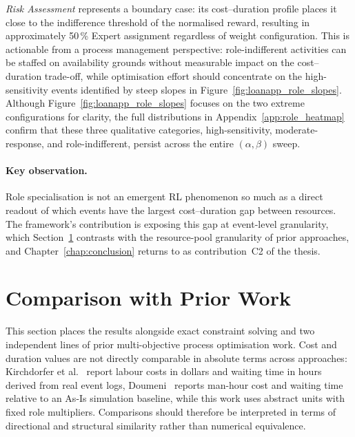 \textit{Risk Assessment} represents a boundary case: its cost--duration profile places it close to the indifference threshold of the normalised reward, resulting in approximately 50\,\% Expert assignment regardless of weight configuration. This is actionable from a process management perspective: role-indifferent activities can be staffed on availability grounds without measurable impact on the cost--duration trade-off, while optimisation effort should concentrate on the high-sensitivity events identified by steep slopes in Figure~\ref{fig:loanapp_role_slopes}. Although Figure~\ref{fig:loanapp_role_slopes} focuses on the two extreme configurations for clarity, the full distributions in Appendix~\ref{app:role_heatmap} confirm that these three qualitative categories, high-sensitivity, moderate-response, and role-indifferent, persist across the entire $(\alpha, \beta)$ sweep.

\paragraph{Key observation.} Role specialisation is not an emergent RL phenomenon so much as a direct readout of which events have the largest cost--duration gap between resources. The framework's contribution is exposing this gap at event-level granularity, which Section~\ref{sec:discussion_prior_work} contrasts with the resource-pool granularity of prior approaches, and Chapter~\ref{chap:conclusion} returns to as contribution~C2 of the thesis.

\section{Comparison with Prior Work}
\label{sec:discussion_prior_work}

This section places the results alongside exact constraint solving and two independent lines of prior multi-objective process optimisation work. Cost and duration values are not directly comparable in absolute terms across approaches: Kirchdorfer et al.~\cite{KirchdorferLukasFromPolicies} report labour costs in dollars and waiting time in hours derived from real event logs, Doumeni~\cite{ArtemisDoumeniParetoAgentSimulator} reports man-hour cost and waiting time relative to an As-Is simulation baseline, while this work uses abstract units with fixed role multipliers. Comparisons should therefore be interpreted in terms of directional and structural similarity rather than numerical equivalence.


